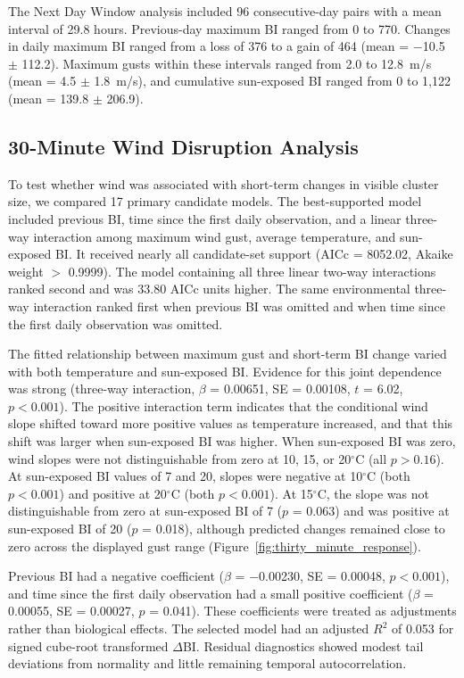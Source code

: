 \documentclass[insects,article,submit,pdftex,moreauthors]{Definitions/mdpi}
\begin{document}
The Next Day Window analysis included 96 consecutive-day pairs with a mean interval of 29.8 hours. Previous-day maximum BI ranged from 0 to 770. Changes in daily maximum BI ranged from a loss of 376 to a gain of 464 (mean = $-$10.5 $\pm$ 112.2). Maximum gusts within these intervals ranged from 2.0 to 12.8~m/s (mean = 4.5 $\pm$ 1.8~m/s), and cumulative sun-exposed BI ranged from 0 to 1,122 (mean = 139.8 $\pm$ 206.9).

\subsection{30-Minute Wind Disruption Analysis}

To test whether wind was associated with short-term changes in visible cluster size, we compared 17 primary candidate models. The best-supported model included previous BI, time since the first daily observation, and a linear three-way interaction among maximum wind gust, average temperature, and sun-exposed BI. It received nearly all candidate-set support (AICc = 8052.02, Akaike weight $>$ 0.9999). The model containing all three linear two-way interactions ranked second and was 33.80 AICc units higher. The same environmental three-way interaction ranked first when previous BI was omitted and when time since the first daily observation was omitted.

The fitted relationship between maximum gust and short-term BI change varied with both temperature and sun-exposed BI. Evidence for this joint dependence was strong (three-way interaction, $\beta$ = 0.00651, SE = 0.00108, $t$ = 6.02, $p < 0.001$). The positive interaction term indicates that the conditional wind slope shifted toward more positive values as temperature increased, and that this shift was larger when sun-exposed BI was higher. When sun-exposed BI was zero, wind slopes were not distinguishable from zero at 10, 15, or 20$^{\circ}$C (all $p > 0.16$). At sun-exposed BI values of 7 and 20, slopes were negative at 10$^{\circ}$C (both $p < 0.001$) and positive at 20$^{\circ}$C (both $p < 0.001$). At 15$^{\circ}$C, the slope was not distinguishable from zero at sun-exposed BI of 7 ($p$ = 0.063) and was positive at sun-exposed BI of 20 ($p$ = 0.018), although predicted changes remained close to zero across the displayed gust range (Figure~\ref{fig:thirty_minute_response}).

Previous BI had a negative coefficient ($\beta$ = $-$0.00230, SE = 0.00048, $p < 0.001$), and time since the first daily observation had a small positive coefficient ($\beta$ = 0.00055, SE = 0.00027, $p$ = 0.041). These coefficients were treated as adjustments rather than biological effects. The selected model had an adjusted $R^2$ of 0.053 for signed cube-root transformed $\Delta$BI. Residual diagnostics showed modest tail deviations from normality and little remaining temporal autocorrelation.
\end{document}
